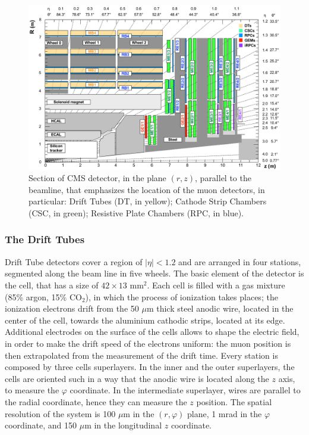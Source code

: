 \begin{figure}[!htb]
  \centering
    \includegraphics[width=.9\textwidth]{figures/cmsmuon.png}
  \caption{Section of CMS detector, in the plane $(r,z)$, parallel to the beamline, that emphasizes the location of the muon detectors, in particular: Drift Tubes (DT, in yellow); Cathode Strip Chambers (CSC, in green); Resistive Plate Chambers (RPC, in blue).~\cite{Chatrchyan:2008zzk}}
  \label{fig:CMS_muon}
\end{figure}


\subsubsection{The Drift Tubes}
Drift Tube detectors cover a region of $|\eta|<1.2$ and are arranged in four stations, segmented along the beam line in five wheels. The basic element of the detector is the cell, that has a size of $42 \times 13 \text{ mm}^2$. Each cell is filled with a gas mixture (85\% argon, 15\% $\text{CO}_2$), in which the process of ionization takes places; the ionization electrons drift from the 50 $\mu$m thick steel anodic wire, located in the center of the cell, towards the aluminium cathodic strips, located at its edge. Additional electrodes on the surface of the cells allows to shape the electric field, in order to make the drift speed of the electrons uniform: the muon position is then extrapolated from the measurement of the drift time. Every station is composed by three cells superlayers. In the inner and the outer superlayers, the cells are oriented such in a way that the anodic wire is located along the $z$ axis, to measure the $\varphi$ coordinate. In the intermediate superlayer, wires are parallel to the radial coordinate, hence they can measure the $z$ position. The spatial resolution of the system is 100 $\mu$m in the $(r, \varphi)$ plane, 1 mrad in the $\varphi$ coordinate, and 150 $\mu$m in the longitudinal $z$ coordinate.

